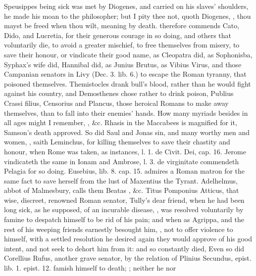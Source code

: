 Speusippes being sick was met by Diogenes, and carried on his slaves'
shoulders, he made his moan to the philosopher; but I pity thee not,
quoth Diogenes, , thou mayst be freed when
thou wilt, meaning by death. \Seneca{} therefore commends Cato,
Dido, and Lucretia, for their generous courage in so doing, and others
that voluntarily die, to avoid a greater mischief, to free themselves
from misery, to save their honour, or vindicate their good name, as
Cleopatra did, as Sophonisba, Syphax's wife did, Hannibal did, as
Junius Brutus, as Vibius Virus, and those Campanian senators in Livy
(Dec. 3. lib. 6.) to escape the Roman tyranny, that poisoned
themselves. Themistocles drank bull's blood, rather than he would fight
against his country, and Demosthenes chose rather to drink poison,
Publius Crassi filius, Censorius and Plancus, those heroical Romans to
make away themselves, than to fall into their enemies' hands. How many
myriads besides in all ages might I remember, , \&c. Rhasis in the Maccabees is magnified for it,
Samson's death approved. So did Saul and Jonas sin, and many worthy men
and women, , saith
Leminchus, for killing themselves to save their chastity and
honour, when Rome was taken, as \Austin instances, l. 1. de Civit. Dei,
cap. 16. Jerome vindicateth the same in Ionam and Ambrose, l. 3. de
virginitate commendeth Pelagia for so doing. Eusebius, lib. 8. cap. 15.
admires a Roman matron for the same fact to save herself from the lust
of Maxentius the Tyrant. Adelhelmus, abbot of Malmesbury, calls them
Beatas , \&c. Titus Pomponius Atticus, that wise,
discreet, renowned Roman senator, Tully's dear friend, when he had been
long sick, as he supposed, of an incurable disease, , was resolved voluntarily by
famine to despatch himself to be rid of his pain; and when as Agrippa,
and the rest of his weeping friends earnestly besought him, , not to offer
violence to himself, with a settled resolution he desired again they
would approve of his good intent, and not seek to dehort him from it:
and so constantly died,  Even so did Corellius Rufus, another grave senator, by the
relation of Plinius Secundus, epist. lib. 1. epist. 12. famish himself
to death; ; neither he nor
